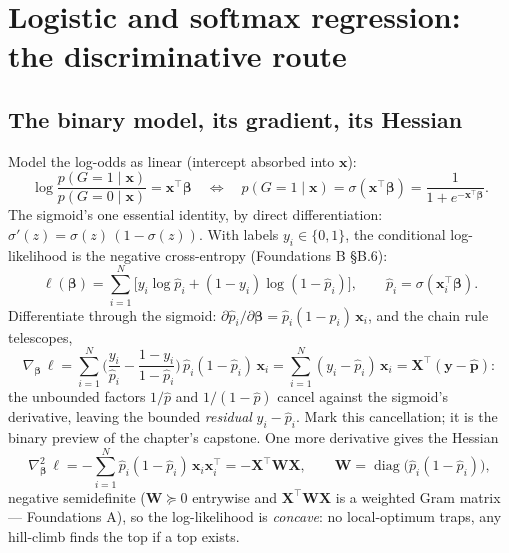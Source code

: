 \documentclass[11pt]{article}
\numberwithin{equation}{section}
\theoremstyle{plain}
\theoremstyle{definition}
\theoremstyle{remark}
\DeclareMathOperator{\diag}{diag}
\newcommand{\x}{\bm{x}}
\newcommand{\X}{\bm{X}}
\newcommand{\y}{\bm{y}}
\newcommand{\bbeta}{\bm{\beta}}
\newcommand{\T}{\top}
\begin{document}
\section{Logistic and softmax regression: the discriminative route}\label{sec:logit}

\subsection{The binary model, its gradient, its Hessian}

Model the log-odds as linear (intercept absorbed into $\x$):
\begin{equation}
\log \frac{p(G = 1 \mid \x)}{p(G = 0 \mid \x)} = \x^\T \bbeta
\quad\Longleftrightarrow\quad
p(G = 1 \mid \x) = \sigma(\x^\T\bbeta) = \frac{1}{1 + e^{-\x^\T\bbeta}} .
\label{eq:logitmodel}
\end{equation}
The sigmoid's one essential identity, by direct differentiation: $\sigma'(z) = \sigma(z)\,(1 - \sigma(z))$. With labels $y_i \in \{0, 1\}$, the conditional log-likelihood is the negative cross-entropy (Foundations B \S B.6):
\begin{equation}
\ell(\bbeta) = \sum_{i=1}^N \Big[ y_i \log \hat p_i + (1 - y_i)\log(1 - \hat p_i) \Big],
\qquad \hat p_i = \sigma(\x_i^\T \bbeta).
\label{eq:logitll}
\end{equation}
Differentiate through the sigmoid: $\partial \hat p_i / \partial \bbeta = \hat p_i (1 - \hat p_i)\, \x_i$, and the chain rule telescopes,
\begin{equation}
\nabla_{\bbeta}\, \ell
= \sum_{i=1}^N \Big( \frac{y_i}{\hat p_i} - \frac{1 - y_i}{1 - \hat p_i} \Big)\, \hat p_i (1 - \hat p_i)\, \x_i
= \sum_{i=1}^N (y_i - \hat p_i)\, \x_i
= \X^\T (\y - \hat{\bm{p}}) :
\label{eq:logitgrad}
\end{equation}
the unbounded factors $1/\hat p$ and $1/(1-\hat p)$ cancel against the sigmoid's derivative, leaving the bounded \emph{residual} $y_i - \hat p_i$. Mark this cancellation; it is the binary preview of the chapter's capstone. One more derivative gives the Hessian
\begin{equation}
\nabla^2_{\bbeta}\, \ell = -\sum_{i=1}^N \hat p_i (1 - \hat p_i)\, \x_i \x_i^\T = -\X^\T \bm{W} \X,
\qquad \bm{W} = \diag\big(\hat p_i (1 - \hat p_i)\big),
\label{eq:logithess}
\end{equation}
negative semidefinite ($\bm{W} \succeq 0$ entrywise and $\X^\T\bm{W}\X$ is a weighted Gram matrix --- Foundations A), so the log-likelihood is \emph{concave}: no local-optimum traps, any hill-climb finds the top if a top exists.
\end{document}
